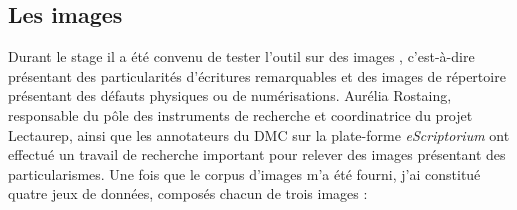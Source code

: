 \subsection{Les images} 
Durant le stage il a été convenu de tester l'outil sur des images , c'est-à-dire présentant des particularités d'écritures remarquables et des images de répertoire présentant des défauts physiques ou de numérisations.  Aurélia Rostaing, responsable du pôle des instruments de recherche et coordinatrice du projet Lectaurep, ainsi que les annotateurs du DMC sur la plate-forme \textit{eScriptorium} ont effectué un travail de recherche important pour relever des images présentant des particularismes. Une fois que le corpus d'images m'a été fourni, j'ai constitué quatre jeux de données, composés chacun de trois images :

